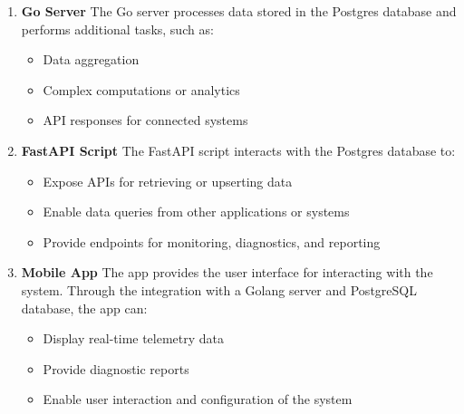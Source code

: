 \begin{enumerate}
\item \textbf{Go Server} The Go server processes data stored in the Postgres database and performs additional tasks, such as:
\begin{itemize}
    \item Data aggregation
    \item Complex computations or analytics
    \item API responses for connected systems
\end{itemize}
\item \textbf{FastAPI Script} The FastAPI script interacts with the Postgres database to:
\begin{itemize}
    \item Expose APIs for retrieving or upserting data
    \item Enable data queries from other applications or systems
    \item Provide endpoints for monitoring, diagnostics, and reporting
\end{itemize}
\newpage
\item \textbf{Mobile App} The app provides the user interface for interacting with the system. Through the integration with a Golang server and PostgreSQL database, the app can:
\begin{itemize}
    \item Display real-time telemetry data
    \item Provide diagnostic reports
    \item Enable user interaction and configuration of the system
\end{itemize}
\end{enumerate}
